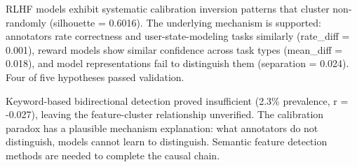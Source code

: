 
RLHF models exhibit systematic calibration inversion patterns that cluster non-randomly (silhouette = 0.6016). The underlying mechanism is supported: annotators rate correctness and user-state-modeling tasks similarly (rate\_diff = 0.001), reward models show similar confidence across task types (mean\_diff = 0.018), and model representations fail to distinguish them (separation = 0.024). Four of five hypotheses passed validation.

Keyword-based bidirectional detection proved insufficient (2.3\% prevalence, r = -0.027), leaving the feature-cluster relationship unverified. The calibration paradox has a plausible mechanism explanation: what annotators do not distinguish, models cannot learn to distinguish. Semantic feature detection methods are needed to complete the causal chain.
